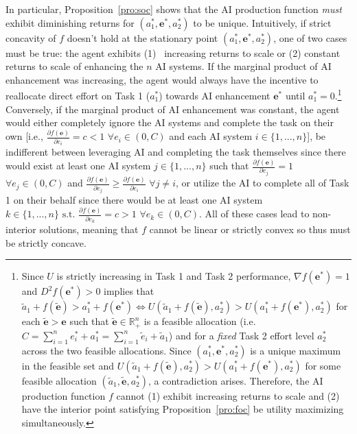 In particular, Proposition~\ref{pro:soc} shows that the AI production function \textit{must} exhibit diminishing returns for $(a^*_1,\mathbf{e}^*,a^*_2)$ to be unique. Intuitively, if strict concavity of $f$ doesn't hold at the stationary point $(a^*_1,\mathbf{e}^*,a^*_2)$, one of two cases must be true: the agent exhibits (1)  increasing returns to scale or (2) constant returns to scale of enhancing the $n$ AI systems. If the marginal product of AI enhancement was increasing, the agent would always have the incentive to reallocate direct effort on Task 1 ($a^*_1$) towards AI enhancement $\mathbf{e}^*$ until $a^*_1=0$.\footnote{Since $U$ is strictly increasing in Task 1 and Task 2 performance, $\nabla f(\mathbf{e}^*)=1$ and $D^2 f(\mathbf{e}^*)>0$ implies that $\tilde{a}_1+f(\tilde{\mathbf{e}})>a_1^*+f({\mathbf{e}^*})\iff U(\tilde{a}_1+f(\tilde{\mathbf{e}}),a_2^*)>U({a}_1^*+f({\mathbf{e}}^*),a_2^*)$ for each $\tilde{\mathbf{e}}>\mathbf{e}$ such that $\tilde{\mathbf{e}}\in\mathbb{R}^n_+$ is a feasible allocation (i.e. $C=\sum_{i=1}^n{e}^*_i+{a}^*_1=\sum_{i=1}^n\tilde{e}_i+\tilde{a}_1$) and for a \textit{fixed} Task 2 effort level $a^*_2$ across the two feasible allocations. Since $(a^*_1,\mathbf{e}^*,a^*_2)$ is a unique maximum in the feasible set and $U(\tilde{a}_1+f(\tilde{\mathbf{e}}),a_2^*)>U({a}_1^*+f({\mathbf{e}}^*),a_2^*)$ for some feasible allocation $(\tilde{a}_1,\tilde{\mathbf{e}},{a}_2^*)$, a contradiction arises. Therefore, the AI production function $f$ cannot (1) exhibit increasing returns to scale and (2) have the interior point satisfying Proposition~\ref{pro:foc} be utility maximizing simultaneously.} Conversely, if the marginal product of AI enhancement was constant, the agent would either completely ignore the AI systems and complete the task on their own [i.e., $\frac{\partial f(\mathbf{e})}{\partial e_i}=c<1$ $\forall e_i\in (0,C)$ and each AI system $i\in\{1,...,n\}$], be indifferent between leveraging AI and completing the task themselves since there would exist at least one AI system $j\in\{1,...,n\}$ such that $\frac{\partial f(\mathbf{e})}{\partial e_j}=1$ $\forall e_j\in(0,C)$ and $\frac{\partial f(\mathbf{e})}{\partial e_j}\geq\frac{\partial f(\mathbf{e})}{\partial e_i}$ $\forall j\neq i$, or utilize the AI to complete all of Task 1 on their behalf since there would be at least one AI system $ k\in\{1,...,n\}\text{ s.t. }\frac{\partial f(\mathbf{e})}{\partial e_k}=c>1$ $\forall e_k\in (0,C)$. All of these cases lead to non-interior solutions, meaning that $f$ cannot be linear or strictly convex so thus must be strictly concave.

